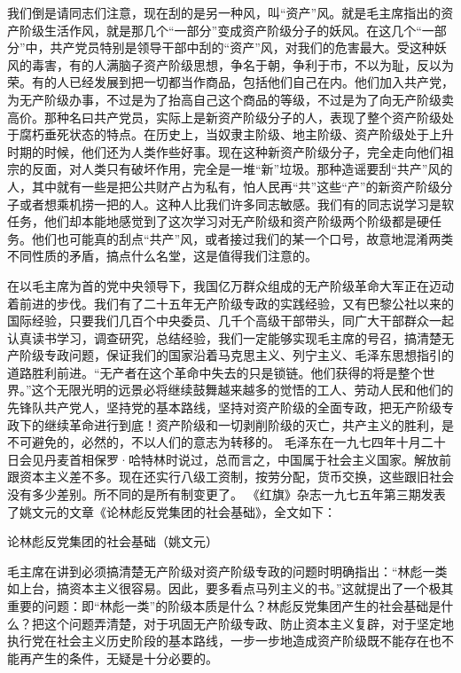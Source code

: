 \begin{maonote}
我们倒是请同志们注意，现在刮的是另一种风，叫“资产”风。就是毛主席指出的资产阶级生活作风，就是那几个“一部分”变成资产阶级分子的妖风。在这几个“一部分”中，共产党员特别是领导干部中刮的“资产”风，对我们的危害最大。受这种妖风的毒害，有的人满脑子资产阶级思想，争名于朝，争利于市，不以为耻，反以为荣。有的人已经发展到把一切都当作商品，包括他们自己在内。他们加入共产党，为无产阶级办事，不过是为了抬高自己这个商品的等级，不过是为了向无产阶级卖高价。那种名曰共产党员，实际上是新资产阶级分子的人，表现了整个资产阶级处于腐朽垂死状态的特点。在历史上，当奴隶主阶级、地主阶级、资产阶级处于上升时期的时候，他们还为人类作些好事。现在这种新资产阶级分子，完全走向他们祖宗的反面，对人类只有破坏作用，完全是一堆“新”垃圾。那种造谣要刮“共产”风的人，其中就有一些是把公共财产占为私有，怕人民再“共”这些“产”的新资产阶级分子或者想乘机捞一把的人。这种人比我们许多同志敏感。我们有的同志说学习是软任务，他们却本能地感觉到了这次学习对无产阶级和资产阶级两个阶级都是硬任务。他们也可能真的刮点“共产”风，或者接过我们的某一个口号，故意地混淆两类不同性质的矛盾，搞点什么名堂，这是值得我们注意的。

在以毛主席为首的党中央领导下，我国亿万群众组成的无产阶级革命大军正在迈动着前进的步伐。我们有了二十五年无产阶级专政的实践经验，又有巴黎公社以来的国际经验，只要我们几百个中央委员、几千个高级干部带头，同广大干部群众一起认真读书学习，调查研究，总结经验，我们一定能够实现毛主席的号召，搞清楚无产阶级专政问题，保证我们的国家沿着马克思主义、列宁主义、毛泽东思想指引的道路胜利前进。“无产者在这个革命中失去的只是锁链。他们获得的将是整个世界。”这个无限光明的远景必将继续鼓舞越来越多的觉悟的工人、劳动人民和他们的先锋队共产党人，坚持党的基本路线，坚持对资产阶级的全面专政，把无产阶级专政下的继续革命进行到底！资产阶级和一切剥削阶级的灭亡，共产主义的胜利，是不可避免的，必然的，不以人们的意志为转移的。
毛泽东在一九七四年十月二十日会见丹麦首相保罗·哈特林时说过，总而言之，中国属于社会主义国家。解放前跟资本主义差不多。现在还实行八级工资制，按劳分配，货币交换，这些跟旧社会没有多少差别。所不同的是所有制变更了。
《红旗》杂志一九七五年第三期发表了姚文元的文章《论林彪反党集团的社会基础》，全文如下：

论林彪反党集团的社会基础（姚文元）

毛主席在讲到必须搞清楚无产阶级对资产阶级专政的问题时明确指出：“林彪一类如上台，搞资本主义很容易。因此，要多看点马列主义的书。”这就提出了一个极其重要的问题：即“林彪一类”的阶级本质是什么？林彪反党集团产生的社会基础是什么？把这个问题弄清楚，对于巩固无产阶级专政、防止资本主义复辟，对于坚定地执行党在社会主义历史阶段的基本路线，一步一步地造成资产阶级既不能存在也不能再产生的条件，无疑是十分必要的。


\end{maonote}
